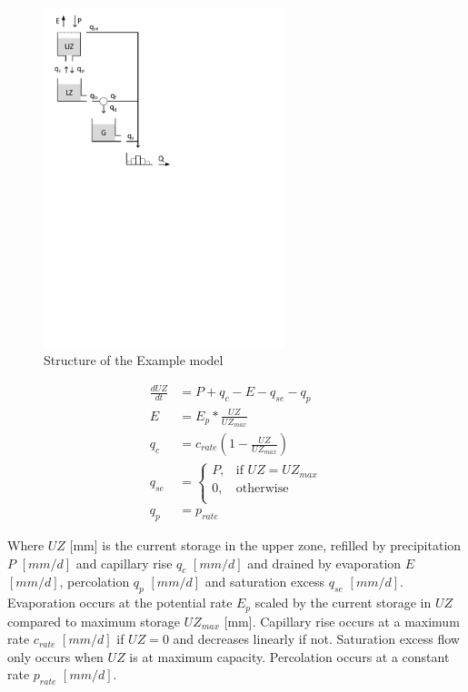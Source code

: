 { 																	%
\begin{figure}
\includegraphics[trim=1cm 16cm 7cm 1cm,width=7cm,keepaspectratio]{./AppA_files/nn_schematic.pdf}
\caption{Structure of the Example model} \label{fig:nn_schematic}
\end{figure}

\begin{align}
	\frac{dUZ}{dt} &= P+ q_c -E-q_{se}-q_p \\
	E &= E_p*\frac{UZ}{UZ_{max}}\\
	q_c &= c_{rate}\left(1-\frac{UZ}{UZ_{max}}\right)\\
	q_{se} &= \begin{cases}
		P, &\text{if } UZ = UZ_{max}\\
		0, &\text{otherwise}\\
	\end{cases}	\\
	q_p &= p_{rate}
\end{align}

Where $UZ$ [mm] is the current storage in the upper zone, refilled by precipitation $P$ $[mm/d]$ and capillary rise $q_c$ $[mm/d]$ and drained by evaporation $E$ $[mm/d]$, percolation $q_p$ $[mm/d]$ and saturation excess $q_{se}$ $[mm/d]$.
Evaporation occurs at the potential rate $E_p$ scaled by the current storage in $UZ$ compared to maximum storage $UZ_{max}$ [mm].
Capillary rise occurs at a maximum rate $c_{rate}$ $[mm/d]$ if $UZ=0$ and decreases linearly if not.
Saturation excess flow only occurs when $UZ$ is at maximum capacity.
Percolation occurs at a constant rate $p_{rate}$ $[mm/d]$.

} %

